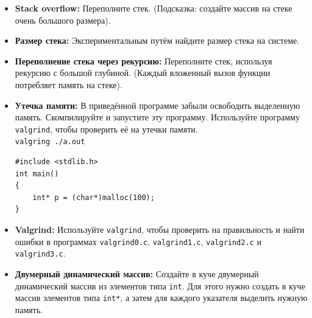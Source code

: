 \documentclass{article}
\begin{document}
\begin{itemize}
\item \textbf{Stack overflow:} Переполните стек. (Подсказка: создайте массив на стеке очень большого размера).
\item \textbf{Размер стека:} Экспериментальным путём найдите размер стека на системе.
\item \textbf{Переполнение стека через рекурсию:} Переполните стек, используя рекурсию с большой глубиной. (Каждый вложенный вызов функции потребляет память на стеке).
\item \textbf{Утечка памяти:}
В приведённой программе забыли освободить выделенную память. Скомпилируйте и запустите эту программу. Используйте программу \texttt{valgrind}, чтобы проверить её на утечки памяти.\\
\texttt{valgring ./a.out}
\begin{lstlisting}
#include <stdlib.h>
int main()
{
	int* p = (char*)malloc(100);
}
\end{lstlisting} 
\item \textbf{Valgrind:} Используйте \texttt{valgrind}, чтобы проверить на правильность и найти ошибки в программах \texttt{valgrind0.c}, \texttt{valgrind1.c}, \texttt{valgrind2.c} и \texttt{valgrind3.c}.
\item \textbf{Двумерный динамический массив:} Создайте в куче двумерный динамический массив из элементов типа \texttt{int}. Для этого нужно создать в куче массив элементов типа \texttt{int*}, а затем для каждого указателя выделить нужную память. 
\end{itemize}
\end{document}
